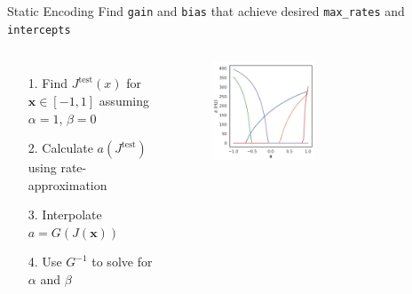 \documentclass[aspectratio=169]{beamer}
\begin{document}
\begin{frame}[fragile]{Static Encoding}
	Find \texttt{gain} and \texttt{bias} that achieve desired \texttt{max\_rates} and \texttt{intercepts}
	\vspace{0.3cm}
	\begin{columns}
		\begin{itemize}
		    \item[1.] Find $J^{\mathrm{test}}(x)$ for $\mathbf{x} \in [-1, 1]$ assuming $\alpha=1$, $\beta=0$ 
		    \item[2.] Calculate $a(J^{\text{test}})$ using rate-approximation
		    \item[3.] Interpolate $a = G(J(\mathbf{x}))$
		    \item[4.] Use $G^{-1}$ to solve for $\alpha$ and $\beta$
		\end{itemize}
		\begin{figure}
		    \centering
		    \includegraphics[width=0.5\textwidth]{media/LIF_tuning_default.png}
		\end{figure}
	\end{columns}
\end{frame}
\end{document}
